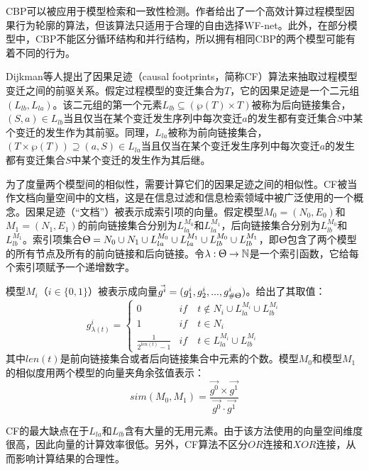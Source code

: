 CBP可以被应用于模型检索和一致性检测。作者给出了一个高效计算过程模型因果行为轮廓的算法\cite{weidlich2010efficient}，但该算法只适用于合理的自由选择WF-net。此外，在部分模型中，CBP不能区分循环结构和并行结构，所以拥有相同CBP的两个模型可能有着不同的行为。

Dijkman等人提出了因果足迹（causal footprints，简称CF）算法来抽取过程模型变迁之间的前驱关系\cite{dijkman2011similarity}。假定过程模型的变迁集合为$T$，它的因果足迹是一个二元组$(L_{lb},L_{la})$。该二元组的第一个元素$L_{lb}\subseteq (\wp(T)\times T)$被称为后向链接集合，$(S,a)\in L_{lb}$当且仅当在某个变迁发生序列中每次变迁$a$的发生都有变迁集合$S$中某个变迁的发生作为其前驱。同理，$L_{la}$被称为前向链接集合，$(T\times\wp(T))\supseteq(a,S)\in L_{la}$当且仅当在某个变迁发生序列中每次变迁$a$的发生都有变迁集合$S$中某个变迁的发生作为其后继。

为了度量两个模型间的相似性，需要计算它们的因果足迹之间的相似性。CF被当作文档向量空间中的文档，这是在信息过滤和信息检索领域中被广泛使用的一个概念\cite{salton1975vector}。因果足迹（“文档”）被表示成索引项的向量。假定模型$M_{0}=(N_{0},E_{0})$和$M_{1}=(N_{1},E_{1})$的前向链接集合分别为$L_{la}^{M_{0}}$和$L_{la}^{M_{1}}$，后向链接集合分别为$L_{lb}^{M_{0}}$和$L_{lb}^{M_{1}}$。索引项集合$\Uptheta=N_{0}\cup N_{1}\cup L_{la}^{M_{0}}\cup L_{la}^{M_{1}}\cup L_{lb}^{M_{0}}\cup L_{lb}^{M_{1}}$，即$\Uptheta$包含了两个模型的所有节点及所有的前向链接和后向链接。令$\lambda:\Uptheta\rightarrow\mathbb{N}$是一个索引函数，它给每个索引项赋予一个递增数字。

模型$M_{i}$（$i\in\{0,1\}$）被表示成向量$\vec{g^{i}}=(g_{1}^{i},g_{2}^{i},...,g_{\#\Uptheta}^{i})$。给出了其取值：
\begin{displaymath}
  g{_{\lambda(t)}^i}=
    \begin{cases}
        0& if\quad t\notin N_i\cup L{_{la}^{M_i}}\cup L{_{lb}^{M_i}}\\
        1& if\quad t\in N_i\\
        \frac{1}{2^{len(t)}-1}& if\quad t\in L{_{la}^{M_i}}\cup L{_{lb}^{M_i}}
    \end{cases}
\end{displaymath}
其中$len(t)$是前向链接集合或者后向链接集合中元素的个数。模型$M_{0}$和模型$M_{1}$的相似度用两个模型的向量夹角余弦值表示：
\begin{displaymath}
  sim(M_{0},M_{1})=\frac{\vec{g^{0}}\times\vec{g^{1}}}{\vec{g^{0}}\cdot\vec{g^{1}}}
\end{displaymath}

CF的最大缺点在于$L_{la}$和$L_{lb}$含有大量的无用元素\cite{dijkman2011similarity,van2008measuring}。由于该方法使用的向量空间维度很高，因此向量的计算效率很低。另外，CF算法不区分$OR$连接和$XOR$连接，从而影响计算结果的合理性。

